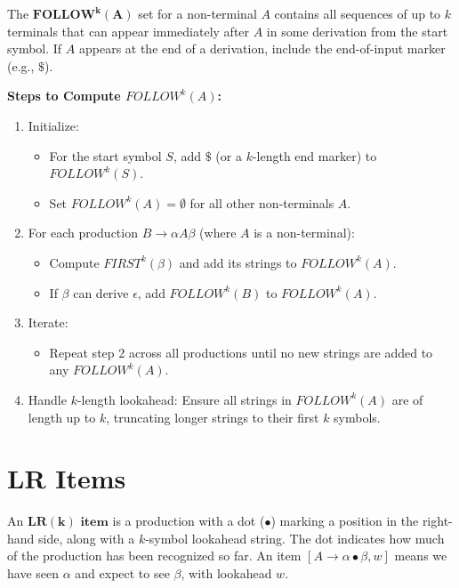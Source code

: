 The $\mathbf{FOLLOW^k(A)}$ set for a non-terminal $A$ contains all sequences of up to $k$ terminals that can appear immediately after $A$ in some derivation from the start symbol. If $A$ appears at the end of a derivation, include the end-of-input marker (e.g., $\$$).

\textbf{Steps to Compute $FOLLOW^k(A)$:}
\begin{enumerate}
    \item Initialize:
    \begin{itemize}
        \item For the start symbol $S$, add $\$$ (or a $k$-length end marker) to $FOLLOW^k(S)$.
        \item Set $FOLLOW^k(A) = \emptyset$ for all other non-terminals $A$.
    \end{itemize}
    
    \item For each production $B \to \alpha A \beta$ (where $A$ is a non-terminal):
    \begin{itemize}
        \item Compute $FIRST^k(\beta)$ and add its strings to $FOLLOW^k(A)$.
        \item If $\beta$ can derive $\epsilon$, add $FOLLOW^k(B)$ to $FOLLOW^k(A)$.
    \end{itemize}
    
    \item Iterate:
    \begin{itemize}
        \item Repeat step 2 across all productions until no new strings are added to any $FOLLOW^k(A)$.
    \end{itemize}
    
    \item Handle $k$-length lookahead: Ensure all strings in $FOLLOW^k(A)$ are of length up to $k$, truncating longer strings to their first $k$ symbols.
\end{enumerate}



\section{LR Items}

An $\mathbf{LR(k) \text{ item}}$ is a production with a dot ($\bullet$) marking a position in the right-hand side, along with a $k$-symbol lookahead string. The dot indicates how much of the production has been recognized so far. An item $[A \to \alpha \bullet \beta, w]$ means we have seen $\alpha$ and expect to see $\beta$, with lookahead $w$.


